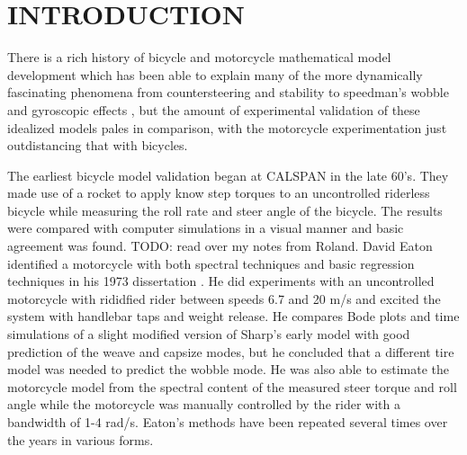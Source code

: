\documentclass[twocolumn,10pt]{asme2e}
\begin{document}
\section*{INTRODUCTION}

There is a rich history of bicycle and motorcycle mathematical model
development which has been able to explain many of the more dynamically
fascinating phenomena from countersteering and stability to speedman's wobble
and gyroscopic effects \cite{Limebeer2006, Meijaard2007, Meijaard2011}, but the
amount of experimental validation of these idealized models pales in
comparison, with the motorcycle experimentation just outdistancing that with
bicycles.

The earliest bicycle model validation began at CALSPAN in the late 60's. They
made use of a rocket to apply know step torques to an uncontrolled riderless
bicycle while measuring the roll rate and steer angle of the bicycle. The
results were compared with computer simulations in a visual manner and basic
agreement was found. TODO: read over my notes from Roland. David Eaton
identified a motorcycle with both spectral techniques and basic regression
techniques in his 1973 dissertation \cite{Eaton1973}. He did experiments with
an uncontrolled motorcycle with rididfied rider between speeds 6.7 and 20 m/s
and excited the system with handlebar taps and weight release. He compares Bode
plots and time simulations of a slight modified version of Sharp's early model
\cite{Sharp1971} with good prediction of the weave and capsize modes, but he
concluded that a different tire model was needed to predict the wobble mode. He
was also able to estimate the motorcycle model from the spectral content of the
measured steer torque and roll angle while the motorcycle was manually
controlled by the rider with a bandwidth of 1-4 rad/s. Eaton's methods have been
repeated several times over the years in various forms.
\end{document}
